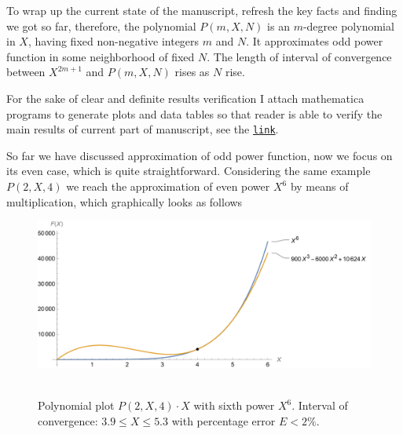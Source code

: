 To wrap up the current state of the manuscript, refresh the key facts and finding we got so far,
therefore, the polynomial $P(m,X,N)$ is an $m$-degree polynomial in $X$, having fixed non-negative
integers $m$ and $N$.
It approximates odd power function in some neighborhood of fixed $N$.
The length of interval of convergence between $X^{2m+1}$ and $P(m,X,N)$ rises as $N$ rise.

For the sake of clear and definite results verification I attach mathematica programs to generate
plots and data tables so that reader is able to verify the main results of current part of manuscript,
see the \href{https://gist.github.com/kolosovpetro/2b5c55094c66b8d6a97b9798be9a8dec}{\texttt{link}}.

So far we have discussed approximation of odd power function, now we focus on its even case,
which is quite straightforward.
Considering the same example $P(2, X, 4)$ we reach the approximation of even power $X^6$
by means of multiplication, which graphically looks as follows
\begin{figure}[H]
    \centering
    \includegraphics[width=1\textwidth]{sections/images/07_plot_of_6th_power_with_p_2_4_times_x}
    ~\caption{Polynomial plot $P(2, X, 4)\cdot X$ with sixth power $X^6$.
    Interval of convergence: $3.9 \leq X \leq 5.3$ with percentage error $E < 2\%$.
    }\label{fig:07_plot_of_6th_power_with_p_2_4_times_x}
\end{figure}

